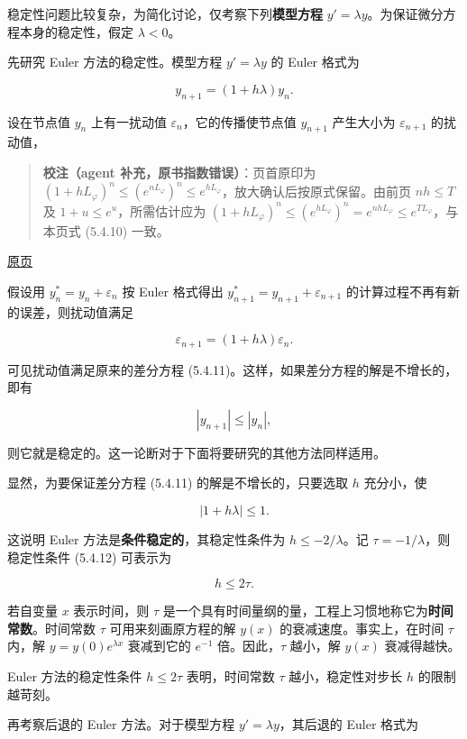 \documentclass[
  10pt,
  fontset=fandol]{ctexart}
\begin{document}
稳定性问题比较复杂，为简化讨论，仅考察下列\textbf{模型方程} \(y'=\lambda y\)。为保证微分方程本身的稳定性，假定 \(\lambda<0\)。

先研究 Euler 方法的稳定性。模型方程 \(y'=\lambda y\) 的 Euler 格式为

\[
y_{n+1}=(1+h\lambda)y_n.\tag{5.4.11}
\]

设在节点值 \(y_n\) 上有一扰动值 \(\varepsilon_n\)，它的传播使节点值 \(y_{n+1}\) 产生大小为 \(\varepsilon_{n+1}\) 的扰动值，

\begin{quote}
\textbf{校注（agent 补充，原书指数错误）}：页首原印为 \((1+hL_\varphi)^n\leqslant(e^{nL_\varphi})^n\leqslant e^{hL_\varphi}\)，放大确认后按原式保留。由前页 \(nh\leqslant T\) 及 \(1+u\leqslant e^u\)，所需估计应为 \((1+hL_\varphi)^n\leqslant(e^{hL_\varphi})^n=e^{nhL_\varphi}\leqslant e^{TL_\varphi}\)，与本页式 (5.4.10) 一致。
\end{quote}

\href{../../source-images/pdf-136.jpeg}{原页}

假设用 \(y_n^*=y_n+\varepsilon_n\) 按 Euler 格式得出 \(y_{n+1}^*=y_{n+1}+\varepsilon_{n+1}\) 的计算过程不再有新的误差，则扰动值满足

\[
\varepsilon_{n+1}=(1+h\lambda)\varepsilon_n.
\]

可见扰动值满足原来的差分方程 (5.4.11)。这样，如果差分方程的解是不增长的，即有

\[
|y_{n+1}|\leqslant|y_n|,
\]

则它就是稳定的。这一论断对于下面将要研究的其他方法同样适用。

显然，为要保证差分方程 (5.4.11) 的解是不增长的，只要选取 \(h\) 充分小，使

\[
|1+h\lambda|\leqslant1.\tag{5.4.12}
\]

这说明 Euler 方法是\textbf{条件稳定的}，其稳定性条件为 \(h\leqslant-2/\lambda\)。记 \(\tau=-1/\lambda\)，则稳定性条件 (5.4.12) 可表示为

\[
h\leqslant2\tau.\tag{5.4.13}
\]

若自变量 \(x\) 表示时间，则 \(\tau\) 是一个具有时间量纲的量，工程上习惯地称它为\textbf{时间常数}。时间常数 \(\tau\) 可用来刻画原方程的解 \(y(x)\) 的衰减速度。事实上，在时间 \(\tau\) 内，解 \(y=y(0)e^{\lambda x}\) 衰减到它的 \(e^{-1}\) 倍。因此，\(\tau\) 越小，解 \(y(x)\) 衰减得越快。

Euler 方法的稳定性条件 \(h\leqslant2\tau\) 表明，时间常数 \(\tau\) 越小，稳定性对步长 \(h\) 的限制越苛刻。

再考察后退的 Euler 方法。对于模型方程 \(y'=\lambda y\)，其后退的 Euler 格式为
\end{document}
